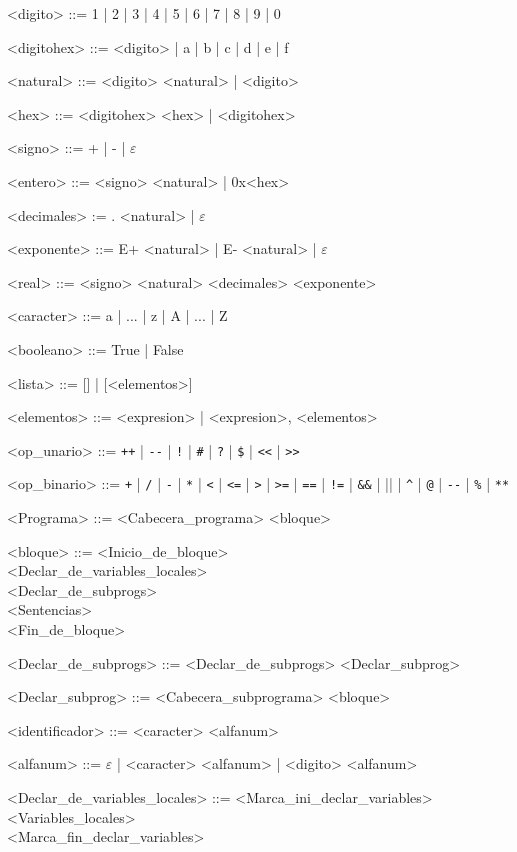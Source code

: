 \documentclass{scrartcl}
\begin{document}
\setlength{\grammarparsep}{4pt plus 1pt minus 1pt}
\begin{grammar}

<digito> ::= 1 | 2 | 3 | 4 | 5 | 6 | 7 | 8 | 9 | 0

<digitohex> ::= <digito> | a | b | c | d | e | f

<natural> ::= <digito> <natural> | <digito>

<hex> ::= <digitohex> <hex> | <digitohex>

<signo> ::= + | - | $\varepsilon$

<entero> ::= <signo> <natural> | 0x<hex>

<decimales> := . <natural> | $\varepsilon$

<exponente> ::= E+ <natural> | E- <natural> | $\varepsilon$

<real> ::= <signo> <natural> <decimales> <exponente>

<caracter> ::= a | ... | z | A | ... | Z

<booleano> ::= True | False

<lista> ::= [] | [<elementos>]

<elementos> ::= <expresion> | <expresion>, <elementos>

<op_unario> ::= \verb|++| | \verb|--| | \verb|!| | \verb|#| | \verb|?| | \verb|$| | \verb|<<| | \verb|>>|

<op_binario> ::= \verb|+| | \verb|/| | \verb|-| | \verb|*| | \verb|<| | \verb|<=| | \verb|>| | \verb|>=| | \verb|==| | \verb|!=| | \verb|&&| | \verb|||| | \verb|^| | \verb|@| | \verb|--| | \verb|%| | \verb|**|

<Programa> ::= <Cabecera_programa> <bloque>

<bloque> ::= <Inicio_de_bloque> \\
 <Declar_de_variables_locales> \\
 <Declar_de_subprogs> \\
 <Sentencias> \\
 <Fin_de_bloque>

<Declar_de_subprogs> ::= <Declar_de_subprogs> <Declar_subprog>

<Declar_subprog> ::= <Cabecera_subprograma> <bloque>

<identificador> ::= <caracter> <alfanum>

<alfanum> ::= $\varepsilon$ | <caracter> <alfanum> | <digito> <alfanum>

<Declar_de_variables_locales> ::= <Marca_ini_declar_variables> \\
<Variables_locales> \\
<Marca_fin_declar_variables>


\end{grammar}
\end{document}
